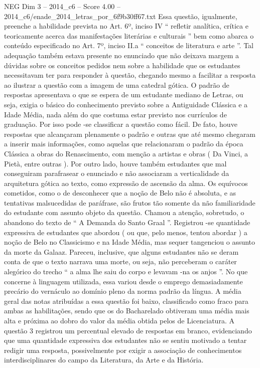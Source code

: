 \begin{textsample}{NEG Dim 3 – 2014\_c6 – Score 4.00 – 2014\_c6/enade\_2014\_letras\_por\_6f9b30ff67.txt}
Essa questão, igualmente, preenche a habilidade prevista no Art. 6º, inciso IV “ refletir analítica, crítica e teoricamente acerca das manifestações literárias e culturais ” bem como abarca o conteúdo especificado no Art. 7º, inciso II.a “ conceitos de literatura e arte ”.
Tal adequação também estava presente no enunciado que não deixava margem a dúvidas sobre os conceitos pedidos nem sobre a habilidade que os estudantes necessitavam ter para responder à questão, chegando mesmo a facilitar a resposta ao ilustrar a questão com a imagem de uma catedral gótica.
O padrão de respostas apresentava o que se espera de um estudante mediano de Letras, ou seja, exigia o básico do conhecimento previsto sobre a Antiguidade Clássica e a Idade Média, nada além do que costuma estar previsto nos currículos de graduação.
Por isso pode -se classificar a questão como fácil.
De fato, houve respostas que alcançaram plenamente o padrão e outras que até mesmo chegaram a inserir mais informações, como aquelas que relacionaram o padrão da época Clássica a obras do Renascimento, com menção a artistas e obras ( Da Vinci, a Pietà, entre outras ).
Por outro lado, houve também estudantes que mal conseguiram parafrasear o enunciado e não associaram a verticalidade da arquitetura gótica ao texto, como expressão de ascensão da alma.
Os equívocos cometidos, como o de desconhecer que a noção de Belo não é absoluta, e as tentativas malsucedidas de paráfrase, são frutos tão somente da não familiaridade do estudante com assunto objeto da questão.
Chamou a atenção, sobretudo, o abandono do texto de “ A Demanda do Santo Graal ”.
Registrou -se quantidade expressiva de estudantes que abordou ( ou que, pelo menos, tentou abordar ) a noção de Belo no Classicismo e na Idade Média, mas sequer tangenciou o assunto da morte da Galaaz.
Pareceu, inclusive, que alguns estudantes não se deram conta de que o texto narrava uma morte, ou seja, não perceberam o caráter alegórico do trecho “ a alma lhe saiu do corpo e levavam -na os anjos ”.
No que concerne à linguagem utilizada, essa variou desde o emprego demasiadamente precário do vernáculo ao domínio pleno da norma padrão da língua.
A média geral das notas atribuídas a essa questão foi baixo, classificado como fraco para ambas as habilitações, sendo que os do Bacharelado obtiveram uma média mais alta e próxima ao dobro do valor da média obtida pelos de Licenciatura.
A questão 3 registrou um percentual elevado de respostas em branco, evidenciando que uma quantidade expressiva dos estudantes não se sentiu motivado a tentar redigir uma resposta, possivelmente por exigir a associação de conhecimentos interdisciplinares do campo da Literatura, da Arte e da História.

\end{textsample}
